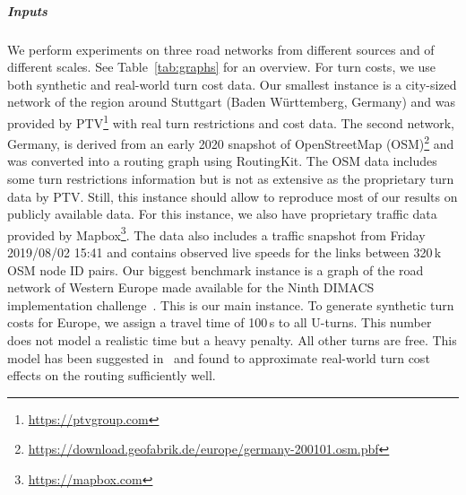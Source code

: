 \documentclass[a4paper, english, cleveref]{lipics-v2021}
\begin{document}
\subparagraph{Inputs}
We perform experiments on three road networks from different sources and of different scales.
See Table~\ref{tab:graphs} for an overview.
For turn costs, we use both synthetic and real-world turn cost data.
Our smallest instance is a city-sized network of the region around Stuttgart (Baden Württemberg, Germany) and was provided by PTV\footnote{\url{https://ptvgroup.com}} with real turn restrictions and cost data.
The second network, Germany, is derived from an early 2020 snapshot of OpenStreetMap (OSM)\footnote{\url{https://download.geofabrik.de/europe/germany-200101.osm.pbf}} and was converted into a routing graph using RoutingKit.
The OSM data includes some turn restrictions information but is not as extensive as the proprietary turn data by PTV.
Still, this instance should allow to reproduce most of our results on publicly available data.
For this instance, we also have proprietary traffic data provided by Mapbox\footnote{\url{https://mapbox.com}}.
The data also includes a traffic snapshot from Friday 2019/08/02 15:41 and contains observed live speeds for the links between 320\,k OSM node ID pairs.
Our biggest benchmark instance is a graph of the road network of Western Europe made available for the Ninth DIMACS implementation challenge~\cite{DemetrescuGJ09}.
This is our main instance.
To generate synthetic turn costs for Europe, we assign a travel time of 100\,s to all U-turns.
This number does not model a realistic time but a heavy penalty.
All other turns are free.
This model has been suggested in~\cite{DellingGPW17} and found to approximate real-world turn cost effects on the routing sufficiently well.
\end{document}
